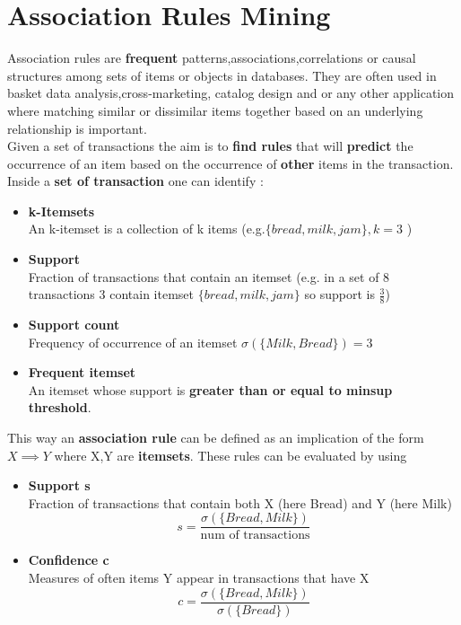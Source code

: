 \newpage
\section{Association Rules Mining}
Association rules are \textbf{frequent} patterns,associations,correlations or causal structures among sets of items or objects in databases. They are often used in basket data analysis,cross-marketing, catalog design and or any other application where matching similar or dissimilar items together based on an underlying relationship is important.\\Given a set of transactions the aim is to \textbf{find rules} that will \textbf{predict} the occurrence of an item based on the occurrence of \textbf{other} items in the transaction. Inside a \textbf{set of transaction} one can identify :
\begin{itemize}
\item \textbf{k-Itemsets}\\
An k-itemset is a collection of k items (e.g.$\{ bread,milk,jam\}, k=3$ )
\item \textbf{Support} \\
Fraction of transactions that contain an itemset (e.g. in a set of 8 transactions 3 contain itemset $\{ bread,milk,jam\}$ so support is $\frac{3}{8} $)
\item \textbf{Support count}\\
Frequency of occurrence of an itemset $\sigma(\{ Milk,Bread\})=3$
\item \textbf{Frequent itemset}\\
An itemset whose support is \textbf{greater than or equal to minsup threshold}.
\end{itemize} 
This way an \textbf{association rule} can be defined as an implication of the form $X \implies Y$ where X,Y are \textbf{itemsets}.
These rules can be evaluated by using 
\begin{itemize}
\item \textbf{Support s}\\
Fraction of transactions that contain both X (here Bread) and Y  (here Milk)
$$ s = \frac{\sigma(\{ Bread, Milk\})}{\text{num of transactions}}$$
\item \textbf{Confidence c}\\
Measures of often items Y appear in transactions that have X 
$$ c= \frac{\sigma(\{Bread,Milk\})}{\sigma(\{Bread\})}$$
\end{itemize}
